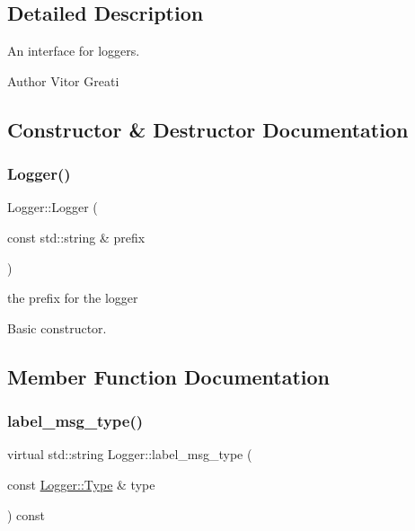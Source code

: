 \subsection{Detailed Description}
An interface for loggers. 

\begin{DoxyAuthor}{Author}
Vitor Greati 
\end{DoxyAuthor}


\subsection{Constructor \& Destructor Documentation}
\mbox{\label{class_logger_a5eb8bf6f6a9111e62a7b2fee03ef7541}} 
\subsubsection{\texorpdfstring{Logger()}{Logger()}}
{\footnotesize\ttfamily Logger\+::\+Logger (\begin{DoxyParamCaption}\item[{const std\+::string \&}]{prefix }\end{DoxyParamCaption})\hspace{0.3cm}{\ttfamily [inline]}}



the prefix for the logger 

Basic constructor. 

\subsection{Member Function Documentation}
\mbox{\label{class_logger_abe4434e4ae0efd8b41cb2a61458a710d}} 
\subsubsection{\texorpdfstring{label\_msg\_type()}{label\_msg\_type()}}
{\footnotesize\ttfamily virtual std\+::string Logger\+::label\+\_\+msg\+\_\+type (\begin{DoxyParamCaption}\item[{const \mbox{\hyperlink{class_logger_acd39cb578d7a6750c959f2fad38d8db6}{Logger\+::\+Type}} \&}]{type }\end{DoxyParamCaption}) const\hspace{0.3cm}{\ttfamily [pure virtual]}}




